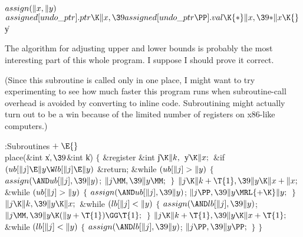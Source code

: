 \Y\B\4\D$\\{assign}(\|x,\|y)$ \5
$\\{assigned}[\\{undo\_ptr}].\\{ptr}\K\|x,\39\\{assigned}[\\{undo\_ptr}\PP].%
\\{val}\K{*}\|x,\39{*}\|x\K{}$\|y\par
\fi

The algorithm for adjusting upper and lower bounds is probably the most
interesting part of this whole program. I suppose I should prove it correct.

(Since this subroutine is called only in one place, I might want to try
experimenting to see how much faster this program runs when subroutine-call
overhead is avoided by converting to inline code. Subroutining might actually
turn out to be a win because of the limited number of registers
on x86-like computers.)

\Y\B\4:Subroutines\X${}\mathrel+\E{}$\6
\\{place}(\&{int} \|x${},\39{}$\&{int} \|k)\6
${}\{{}$\1\6
\&{register} \&{int} \|j${}\K\|k,{}$ \|y${}\K\|x;{}$\7
\&{if} ${}(\\{ub}[\|j]\E\|y\W\\{lb}[\|j]\E\|y){}$\1\5
\&{return};\2\6
\&{while} ${}(\\{ub}[\|j]>\|y){}$\5
${}\{{}$\1\6
${}\\{assign}({\AND}\\{ub}[\|j],\39\|y){}$;\6
${}\|j\MM,\39\|y\MM;{}$\6
\4${}\}{}$\2\6
${}\|j\K\|k+\T{1},\39\|y\K\|x+\|x;{}$\6
\&{while} ${}(\\{ub}[\|j]>\|y){}$\5
${}\{{}$\1\6
${}\\{assign}({\AND}\\{ub}[\|j],\39\|y){}$;\6
${}\|j\PP,\39\|y\MRL{+{\K}}\|y;{}$\6
\4${}\}{}$\2\6
${}\|j\K\|k,\39\|y\K\|x;{}$\6
\&{while} ${}(\\{lb}[\|j]<\|y){}$\5
${}\{{}$\1\6
${}\\{assign}({\AND}\\{lb}[\|j],\39\|y){}$;\6
${}\|j\MM,\39\|y\K(\|y+\T{1})\GG\T{1};{}$\6
\4${}\}{}$\2\6
${}\|j\K\|k+\T{1},\39\|y\K\|x+\T{1};{}$\6
\&{while} ${}(\\{lb}[\|j]<\|y){}$\5
${}\{{}$\1\6
${}\\{assign}({\AND}\\{lb}[\|j],\39\|y){}$;\6
${}\|j\PP,\39\|y\PP;{}$\6
\4${}\}{}$\2\6
\4${}\}{}$\2\par
\fi

